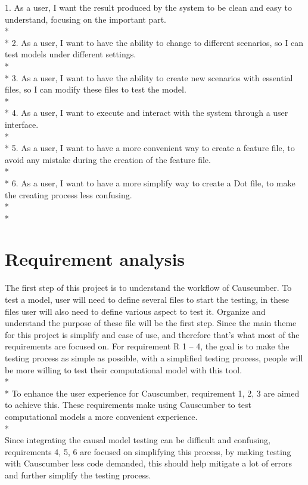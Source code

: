 1. As a user, I want the result produced by the system to be clean and easy to understand, focusing on the important part.\\*
\\*
2. As a user, I want to have the ability to change to different scenarios, so I can test models under different settings.\\*
\\*
3. As a user, I want to have the ability to create new scenarios with essential files, so I can modify these files to test the model.\\*
\\*
4. As a user, I want to execute and interact with the system through a user interface.\\*
\\*
5. As a user, I want to have a more convenient way to create a feature file, to avoid any mistake during the creation of the feature file.\\*
\\*
6. As a user, I want to have a more simplify way to create a Dot file, to make the creating process less confusing. \\*
\\*

\section{Requirement analysis}
The first step of this project is to understand the workflow of Causcumber. To test a model, user will need to define several files to start the testing, in these files user will also need to define various aspect to test it. Organize and understand the purpose of these file will be the first step. Since the main theme for this project is simplify and ease of use, and therefore that’s what most of the requirements are focused on. For requirement R 1 – 4, the goal is to make the testing process as simple as possible, with a simplified testing process, people will be more willing to test their computational model with this tool. \\*\\*
To enhance the user experience for Causcumber, requirement 1, 2, 3 are aimed to achieve this. These requirements make using Causcumber to test computational models a more convenient experience. \\*\\
Since integrating the causal model testing can be difficult and confusing, requirements 4, 5, 6 are focused on simplifying this process, by making testing with Causcumber less code demanded, this should help mitigate a lot of errors and further simplify the testing process.
